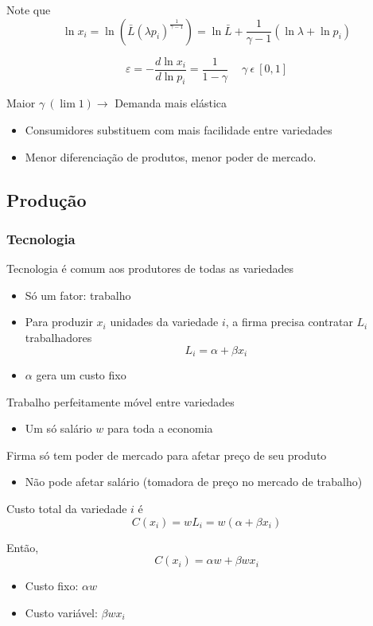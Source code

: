 \documentclass[a4paper,12pt]{article}[abntex2]
\begin{document}
Note que
\[
\ln x_i =\ln (\bar{L}(\lambda p_i)^{\frac{1}{\gamma - 1}}) =\ln \bar{L} + \frac{1}{\gamma - 1} (\ln \lambda + \ln p_i)
\]

\[
\varepsilon = -\frac{d \ln x_i}{d \ln p_i} = \frac{1}{1 - \gamma} \quad \ \gamma \ \epsilon \ [0,1]
\]

Maior \(\gamma\ (\lim 1) \rightarrow\) Demanda mais elástica
\begin{itemize}
    \item Consumidores substituem com mais facilidade entre variedades
    \item Menor diferenciação de produtos, menor poder de mercado.
\end{itemize}

\subsection{\textbf{Produção}}
\subsubsection{\textbf{Tecnologia}}
Tecnologia é comum aos produtores de todas as variedades
\begin{itemize}
    \item Só um fator: trabalho
    \item Para produzir \(x_i\) unidades da variedade \(i\), a firma precisa contratar \(L_i\) trabalhadores
    \[
    L_i = \alpha + \beta x_i
    \]
    \item \(\alpha\) gera um custo fixo
\end{itemize}

Trabalho perfeitamente móvel entre variedades
\begin{itemize}
    \item Um só salário \(w\) para toda a economia
\end{itemize}

Firma só tem poder de mercado para afetar preço de seu produto
\begin{itemize}
    \item Não pode afetar salário (tomadora de preço no mercado de trabalho)
\end{itemize}

Custo total da variedade \(i\) é
\[
C(x_i) = w L_i = w(\alpha + \beta x_i)
\]

Então,
\[
C(x_i) = \alpha w + \beta w x_i
\]

\begin{itemize}
    \item Custo fixo: \(\alpha w\)
    \item Custo variável: \(\beta w x_i\)
\end{itemize}
\end{document}
